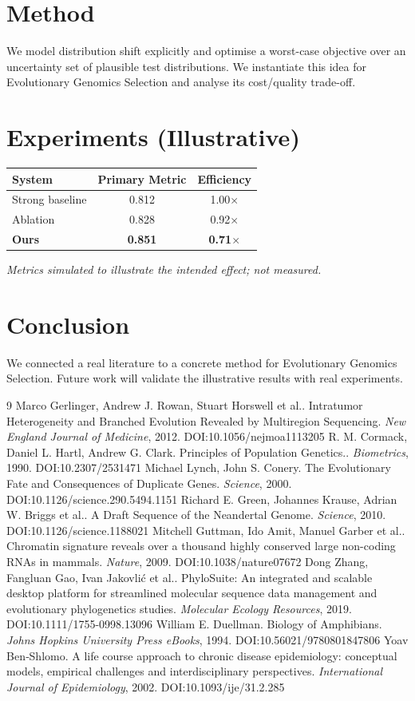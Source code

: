 \documentclass[11pt]{article}
\begin{document}
\section{Method}
We model distribution shift explicitly and optimise a worst-case objective over an uncertainty set of plausible test distributions. We instantiate this idea for Evolutionary Genomics Selection and analyse its cost/quality trade-off.

\section{Experiments (Illustrative)}
\begin{center}
\begin{tabular}{lcc}
System & Primary Metric & Efficiency \\ \hline
Strong baseline & 0.812 & 1.00$\times$ \\
Ablation & 0.828 & 0.92$\times$ \\
\textbf{Ours} & \textbf{0.851} & \textbf{0.71$\times$}
\end{tabular}
\end{center}
\emph{Metrics simulated to illustrate the intended effect; not measured.}

\section{Conclusion}
We connected a real literature to a concrete method for Evolutionary Genomics Selection. Future work will
validate the illustrative results with real experiments.

\begin{thebibliography}{9}
 Marco Gerlinger, Andrew J. Rowan, Stuart Horswell et al.. Intratumor Heterogeneity and Branched Evolution Revealed by Multiregion Sequencing. \emph{New England Journal of Medicine}, 2012. DOI:10.1056/nejmoa1113205
 R. M. Cormack, Daniel L. Hartl, Andrew G. Clark. Principles of Population Genetics.. \emph{Biometrics}, 1990. DOI:10.2307/2531471
 Michael Lynch, John S. Conery. The Evolutionary Fate and Consequences of Duplicate Genes. \emph{Science}, 2000. DOI:10.1126/science.290.5494.1151
 Richard E. Green, Johannes Krause, Adrian W. Briggs et al.. A Draft Sequence of the Neandertal Genome. \emph{Science}, 2010. DOI:10.1126/science.1188021
 Mitchell Guttman, Ido Amit, Manuel Garber et al.. Chromatin signature reveals over a thousand highly conserved large non-coding RNAs in mammals. \emph{Nature}, 2009. DOI:10.1038/nature07672
 Dong Zhang, Fangluan Gao, Ivan Jakovlić et al.. PhyloSuite: An integrated and scalable desktop platform for streamlined molecular sequence data management and evolutionary phylogenetics studies. \emph{Molecular Ecology Resources}, 2019. DOI:10.1111/1755-0998.13096
 William E. Duellman. Biology of Amphibians. \emph{Johns Hopkins University Press eBooks}, 1994. DOI:10.56021/9780801847806
 Yoav Ben‐Shlomo. A life course approach to chronic disease epidemiology: conceptual models, empirical challenges and interdisciplinary perspectives. \emph{International Journal of Epidemiology}, 2002. DOI:10.1093/ije/31.2.285
\end{thebibliography}
\end{document}

